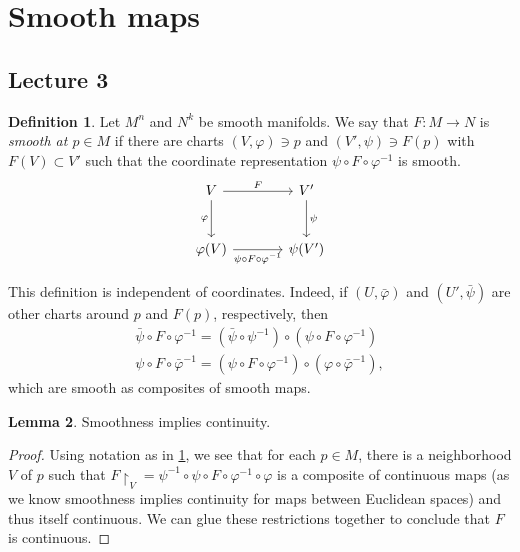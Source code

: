 \documentclass[10pt,letterpaper,cm]{nupset}
\theoremstyle{definition}
\newtheorem{definition}{Definition}[subsection]
\theoremstyle{theorem}
\newtheorem{lemma}[definition]{Lemma}
\theoremstyle{remark}
\newcommand{\1}{\mathbf{1}}
\newcommand{\0}{\vec 0}
\begin{document}
\section{Smooth maps}

\subsection{Lecture 3}

\begin{definition}\label{smap}
Let $M^n$ and $N^k$ be smooth manifolds. We say that $F: M \to N$ is \textit{smooth at $p \in M$} if there are charts $\left(V, \varphi\right) \ni p$ and $\left(V', \psi\right) \ni F(p)$ with $F(V) \subset V'$ such that the coordinate representation $\psi \circ F \circ \varphi^{-1}$ is smooth.
\[
\begin{tikzcd}[row sep=large, column sep = large]
V \arrow[r, "F"] \arrow[d, "\varphi", swap]
& V' \arrow[d, "\psi"] \\
\varphi(V) \arrow[r, "\psi \circ F \circ \varphi^{-1}"']
& \psi(V')
\end{tikzcd}
\]
\end{definition}

This definition is independent of coordinates. Indeed, if $\left(U, \bar{\varphi}\right)$ and $\left(U', \bar{\psi}\right)$ are other charts around $p$ and $F(p)$, respectively, then 
\begin{gather*}
\bar{\psi} \circ F \circ \varphi^{-1} = \left(\bar{\psi} \circ \psi^{-1}\right) \circ \left(\psi \circ F \circ \varphi^{-1}\right)
\\ \psi \circ F\circ \bar{\varphi}^{-1} = \left(\psi \circ F \circ \varphi^{-1}\right) \circ \left(\varphi \circ \bar{\varphi}^{-1}\right),
\end{gather*}
which are smooth as composites of smooth maps.

\begin{lemma}\label{sco}
Smoothness implies continuity.
\end{lemma}
\begin{proof}
Using notation as in \cref{smap}, we see that for each $p\in M$, there is a neighborhood $V$ of $p$ such that $F\restriction_V =  \psi^{-1} \circ \psi \circ F \circ \varphi^{-1} \circ \varphi$ is a composite of continuous maps (as we know smoothness implies continuity for maps between Euclidean spaces) and thus itself continuous. We can glue these restrictions together to conclude that $F$ is continuous. 
\end{proof}
\end{document}
